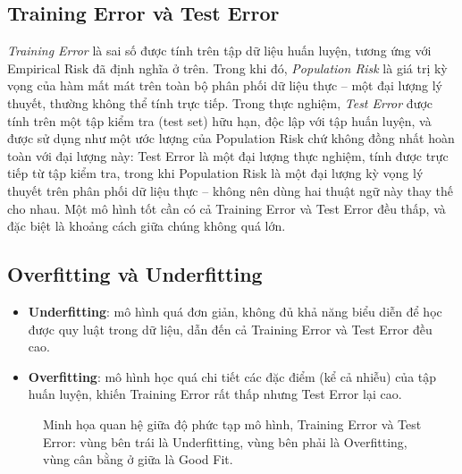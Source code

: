 \subsection{Training Error và Test Error}

\textit{Training Error} là sai số được tính trên tập dữ liệu huấn luyện, tương ứng với Empirical Risk đã định nghĩa ở trên. Trong khi đó, \textit{Population Risk} là giá trị kỳ vọng của hàm mất mát trên toàn bộ phân phối dữ liệu thực -- một đại lượng lý thuyết, thường không thể tính trực tiếp. Trong thực nghiệm, \textit{Test Error} được tính trên một tập kiểm tra (test set) hữu hạn, độc lập với tập huấn luyện, và được sử dụng như một ước lượng của Population Risk chứ không đồng nhất hoàn toàn với đại lượng này: Test Error là một đại lượng thực nghiệm, tính được trực tiếp từ tập kiểm tra, trong khi Population Risk là một đại lượng kỳ vọng lý thuyết trên phân phối dữ liệu thực -- không nên dùng hai thuật ngữ này thay thế cho nhau. Một mô hình tốt cần có cả Training Error và Test Error đều thấp, và đặc biệt là khoảng cách giữa chúng không quá lớn.

\subsection{Overfitting và Underfitting}

\begin{itemize}
    \item \textbf{Underfitting}: mô hình quá đơn giản, không đủ khả năng biểu diễn để học được quy luật trong dữ liệu, dẫn đến cả Training Error và Test Error đều cao.
    \item \textbf{Overfitting}: mô hình học quá chi tiết các đặc điểm (kể cả nhiễu) của tập huấn luyện, khiến Training Error rất thấp nhưng Test Error lại cao.
\end{itemize}

\begin{figure}[H]
\centering
{}
\caption{Minh họa quan hệ giữa độ phức tạp mô hình, Training Error và Test Error: vùng bên trái là Underfitting, vùng bên phải là Overfitting, vùng cân bằng ở giữa là Good Fit.}
\label{fig:underfit-overfit}
\end{figure}

